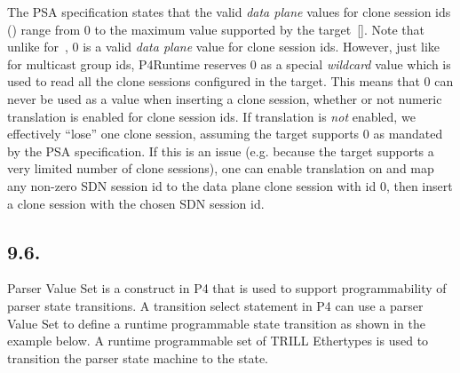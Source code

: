 \documentclass[11pt]{article}
\begin{document}
{%
\noindent{}The PSA specification states that the valid \emph{data plane} values for clone
session ids () range from 0 to the maximum value supported by
the target~[]. Note that unlike for~, 0 is a valid \emph{data plane} value for clone
session ids. However, just like for multicast group ids, P4Runtime reserves 0 as
a special \emph{wildcard} value which is used to read all the clone sessions
configured in the target. This means that 0 can never be used as a 
value when inserting a clone session, whether or not numeric translation is
enabled for clone session ids. If translation is \emph{not} enabled, we effectively
\textquotedblleft{}lose\textquotedblright{} one clone session, assuming the target supports 0 as mandated by the PSA
specification. If this is an issue (e.g. because the target supports a very
limited number of clone sessions), one can enable translation on
 and map any non-zero SDN session id to the data plane clone
session with id 0, then insert a clone session with the chosen SDN session id.%

\subsection{9.6.\hspace*{0.5em}}\label{sec-valuesetentry}%

\noindent{}Parser Value Set is a construct in P4 that is used to support programmability of
parser state transitions. A transition select statement in P4 can use a parser
Value Set to define a runtime programmable state transition as shown in the
example below. A runtime programmable set of TRILL Ethertypes is used to
transition the parser state machine to the  state.%

}
\end{document}
